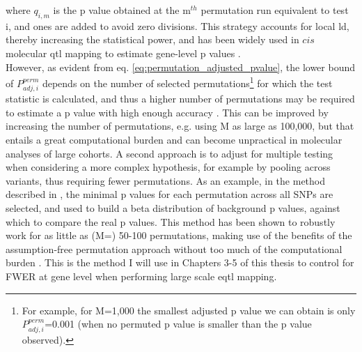 where $q_{i,m}$ is the p value obtained at the m$^{th}$ permutation run equivalent to test i, and ones are added to avoid zero divisions.  
This strategy accounts for local \gls{ld}, thereby increasing the statistical power, and has been widely used in $cis$ molecular \gls{qtl} mapping to estimate gene-level p values \cite{gtex2015genotype, sudmant2015integrated}. \\


However, as evident from eq. \eqref{eq:permutation_adjusted_pvalue}, the lower bound of $P_{adj,i}^{perm}$ depends on the number of selected permutations\footnote{For example, for M=1,000 the smallest adjusted p value we can obtain is only $P_{adj,i}^{perm}$=0.001 (when no permuted p value is smaller than the p value observed).} for which the test statistic is calculated, and thus a higher number of permutations may be required to estimate a p value with high enough accuracy \cite{sul2015accurate}.
This can be improved by increasing the number of permutations, e.g. using M as large as 100,000, but that entails a great computational burden and can become unpractical in molecular analyses of large cohorts.
A second approach is to adjust for multiple testing when considering a more complex hypothesis, for example by pooling across variants, thus requiring fewer permutations.
As an example, in the method described in \cite{ongen2016fast}, the minimal p values for each permutation across all SNPs are selected, and used to build a beta distribution of background p values, against which to compare the real p values.
This method has been shown to robustly work for as little as (M=) 50-100 permutations, making use of the benefits of the assumption-free permutation approach without too much of the computational burden \cite{ongen2016fast}. 
This is the method I will use in Chapters 3-5 of this thesis to control for FWER at gene level when performing large scale \gls{eqtl} mapping.

